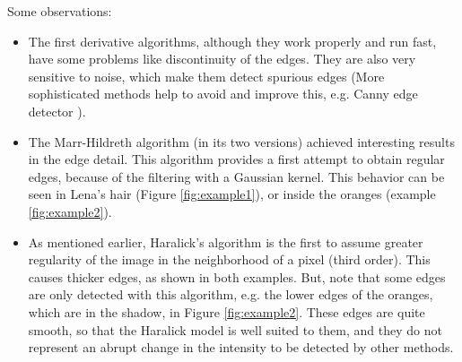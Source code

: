 \documentclass{ipol}
\numberwithin{equation}{section}
\numberwithin{table}{section}
\begin{document}
{Some observations: 
\begin{itemize}
	\item The first derivative algorithms, although they work properly and run fast, have some problems like discontinuity of the edges. They are also very sensitive to noise, which make them detect spurious edges (More sophisticated methods help to avoid and improve this, e.g. Canny edge detector \cite{Canny1986}). \\
	\item The Marr-Hildreth algorithm (in its two versions) achieved interesting results in the edge detail. This algorithm provides a first attempt to obtain regular edges, because of the filtering with a Gaussian kernel. This behavior can be seen in Lena's hair (Figure \ref{fig:example1}), or inside the oranges (example \ref{fig:example2}). \\
	\item As mentioned earlier, Haralick's algorithm is the first to assume greater regularity of the image in the neighborhood of a pixel (third order). This causes thicker edges, as shown in both examples. But, note that some edges are only detected with this algorithm, e.g. the lower edges of the oranges, which are in the shadow, in Figure \ref{fig:example2}. These edges are quite smooth, so that the Haralick model is well suited to them, and they do not represent an abrupt change in the intensity to be detected by other methods. \\
\end{itemize}

\begin{figure}[t!]
	\centering


\end{figure}}
\end{document}
